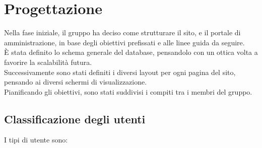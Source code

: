 \section{Progettazione}
Nella fase iniziale, il gruppo ha deciso come strutturare il sito, e il portale di amministrazione, in base degli obiettivi prefissati e alle linee guida da seguire.\\
È stata definito lo schema generale del database, pensandolo con un ottica volta a favorire la scalabilità futura. \\
Successivamente sono stati definiti i diversi layout per ogni pagina del sito, pensando ai diversi schermi di visualizzazione.\\Pianificando gli obiettivi, sono stati suddivisi i compiti tra i membri del gruppo.

\subsection{Classificazione degli utenti}
I tipi di utente sono:
